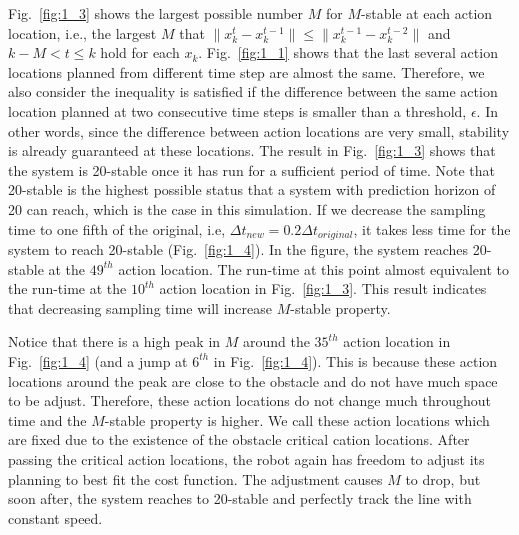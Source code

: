 



Fig.~\ref{fig:1_3} shows the largest possible number $M$ for $M$-stable at each action location, i.e., the largest $M$ that  $\|x_{k}^t-x_k^{t-1}\|\leq \|x_k^{t-1}-x_k^{t-2}\|$ and $k-M< t\leq k$ hold for each $x_k$. Fig.~\ref{fig:1_1} shows that the last several action locations planned from different time step are almost the same. Therefore, we also consider the inequality is satisfied if the difference between the same action location planned at two consecutive time steps is smaller than a threshold, $\epsilon$. In other words, since the difference between action locations are very small, stability is already guaranteed at these locations. The result in Fig.~\ref{fig:1_3} shows that the system is 20-stable once it has run for a sufficient period of time. Note that 20-stable is the highest possible status that a system with prediction horizon of 20 can reach, which is the case in this simulation. If we decrease the sampling time to one fifth of the original, i.e, $\Delta t_{new}=0.2\Delta t_{original}$, it takes less time for the system to reach 20-stable (Fig.~\ref{fig:1_4}). In the figure, the system reaches 20-stable at the $49^{th}$ action location. The run-time at this point almost equivalent to the run-time at the $10^{th}$ action location in Fig.~\ref{fig:1_3}. This result indicates that decreasing sampling time will increase $M$-stable property.

Notice that there is a high peak in $M$ around the $35^{th}$ action location in Fig.~\ref{fig:1_4} (and a jump at $6^{th}$ in Fig.~\ref{fig:1_4}). This is because these action locations around the peak are close to the obstacle and do not have much space to be adjust. Therefore, these action locations do not change much throughout time and the $M$-stable property is higher. We call these action locations which are fixed due to the existence of the obstacle critical cation locations. After passing the critical action locations, the robot again has freedom to adjust its planning to best fit the cost function. The adjustment causes $M$ to drop, but soon after, the system reaches to 20-stable and perfectly track the line with constant speed. 

